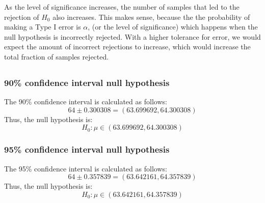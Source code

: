 \documentclass[letterpaper]{article}
\begin{document}

As the level of significance increases, the number of samples that led to the
rejection of $H_0$ also increases. This makes sense, because the the probability
of making a Type I error is $\alpha$, (or the level of significance) which
happens when the null hypothesis is incorrectly rejected. With a higher
tolerance for error, we would expect the amount of incorrect rejections to
increase, which would increase the total fraction of samples rejected.

\subsection{}%




\subsubsection*{90\% confidence interval null hypothesis}
The 90\% confidence interval is calculated as follows:
$$64 \pm 0.300308 = (63.699692, 64.300308)$$
Thus, the null hypothesis is:
$$H_0: \mu \in (63.699692, 64.300308)$$

\subsubsection*{95\% confidence interval null hypothesis}
The 95\% confidence interval is calculated as follows:
$$64 \pm 0.357839 = (63.642161, 64.357839)$$
Thus, the null hypothesis is:
$$H_0: \mu \in (63.642161, 64.357839)$$
\end{document}
